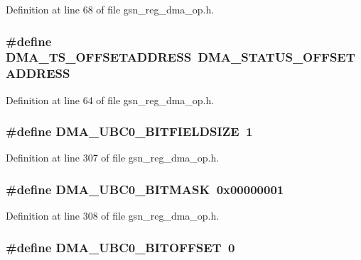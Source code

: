 Definition at line 68 of file gsn\_\-reg\_\-dma\_\-op.h.

\hypertarget{a00547_a3fcea040d62dc0c15c7685b07b420554}{
\subsubsection[{DMA\_\-TS\_\-OFFSETADDRESS}]{\setlength{\rightskip}{0pt plus 5cm}\#define DMA\_\-TS\_\-OFFSETADDRESS~DMA\_\-STATUS\_\-OFFSETADDRESS}}
\label{a00547_a3fcea040d62dc0c15c7685b07b420554}


Definition at line 64 of file gsn\_\-reg\_\-dma\_\-op.h.

\hypertarget{a00547_a6d33db6d777264fea94bb5ae6407a90f}{
\subsubsection[{DMA\_\-UBC0\_\-BITFIELDSIZE}]{\setlength{\rightskip}{0pt plus 5cm}\#define DMA\_\-UBC0\_\-BITFIELDSIZE~1}}
\label{a00547_a6d33db6d777264fea94bb5ae6407a90f}


Definition at line 307 of file gsn\_\-reg\_\-dma\_\-op.h.

\hypertarget{a00547_ab9ec03fa356d8c60b990db7f21824aa2}{
\subsubsection[{DMA\_\-UBC0\_\-BITMASK}]{\setlength{\rightskip}{0pt plus 5cm}\#define DMA\_\-UBC0\_\-BITMASK~0x00000001}}
\label{a00547_ab9ec03fa356d8c60b990db7f21824aa2}


Definition at line 308 of file gsn\_\-reg\_\-dma\_\-op.h.

\hypertarget{a00547_a36678462030ef0892600f230d11a1fe7}{
\subsubsection[{DMA\_\-UBC0\_\-BITOFFSET}]{\setlength{\rightskip}{0pt plus 5cm}\#define DMA\_\-UBC0\_\-BITOFFSET~0}}
\label{a00547_a36678462030ef0892600f230d11a1fe7}


